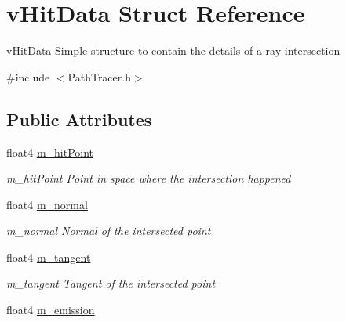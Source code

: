\hypertarget{structvHitData}{\section{v\-Hit\-Data Struct Reference}
\label{structvHitData}
}


\hyperlink{structvHitData}{v\-Hit\-Data} Simple structure to contain the details of a ray intersection  




{\ttfamily \#include $<$Path\-Tracer.\-h$>$}

\subsection*{Public Attributes}
\begin{DoxyCompactItemize}
\item 
\hypertarget{structvHitData_af4cd4b35fd4395c2dcf10a5fc2250a5e}{float4 \hyperlink{structvHitData_af4cd4b35fd4395c2dcf10a5fc2250a5e}{m\-\_\-hit\-Point}}\label{structvHitData_af4cd4b35fd4395c2dcf10a5fc2250a5e}

\begin{DoxyCompactList}\small\item\em m\-\_\-hit\-Point Point in space where the intersection happened \end{DoxyCompactList}\item 
\hypertarget{structvHitData_a2fb269e253faea67892c5ee3f293d235}{float4 \hyperlink{structvHitData_a2fb269e253faea67892c5ee3f293d235}{m\-\_\-normal}}\label{structvHitData_a2fb269e253faea67892c5ee3f293d235}

\begin{DoxyCompactList}\small\item\em m\-\_\-normal Normal of the intersected point \end{DoxyCompactList}\item 
\hypertarget{structvHitData_a7aa6afed75a79e89f4501f1124f1c51b}{float4 \hyperlink{structvHitData_a7aa6afed75a79e89f4501f1124f1c51b}{m\-\_\-tangent}}\label{structvHitData_a7aa6afed75a79e89f4501f1124f1c51b}

\begin{DoxyCompactList}\small\item\em m\-\_\-tangent Tangent of the intersected point \end{DoxyCompactList}\item 
\hypertarget{structvHitData_a75a0edf2ecba13f55529c90e9451b9bb}{float4 \hyperlink{structvHitData_a75a0edf2ecba13f55529c90e9451b9bb}{m\-\_\-emission}}\label{structvHitData_a75a0edf2ecba13f55529c90e9451b9bb}


\end{DoxyCompactItemize}
